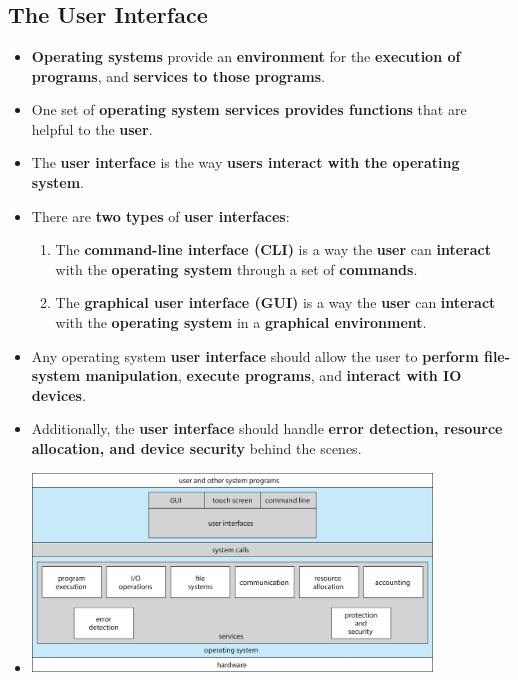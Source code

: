 \documentclass[16pt]{article}
\begin{document}
    \section*{}

    \subsection*{The User Interface}
    \begin{itemize}
        \item \textbf{Operating systems} provide an \textbf{environment} for the \textbf{execution of programs}, and \textbf{services to those programs}.
        \item One set of \textbf{operating system services provides functions} that are helpful to the \textbf{user}.
        \item The \textbf{user interface} is the way \textbf{users interact with the operating system}.
        \item There are \textbf{two types} of \textbf{user interfaces}:
        \begin{enumerate}
            \item The \textbf{command-line interface (CLI)} is a way the \textbf{user} can \textbf{interact} with the \textbf{operating system} through a set of \textbf{commands}.
            \item The \textbf{graphical user interface (GUI)} is a way the \textbf{user} can \textbf{interact} with the \textbf{operating system} in a \textbf{graphical environment}.
        \end{enumerate}
        \item Any operating system \textbf{user interface} should allow the user to \textbf{perform file-system manipulation}, \textbf{execute programs}, and \textbf{interact with IO devices}.
        \item Additionally, the \textbf{user interface} should handle \textbf{error detection, resource allocation, and device security} behind the scenes.
        \item[] \includegraphics[height=200px]{images/User-Interface.jpg}
    \end{itemize}
\end{document}

